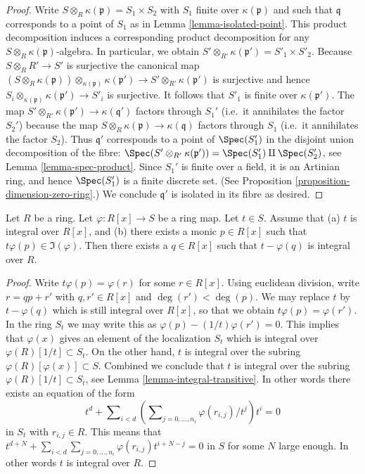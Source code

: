 \begin{proof}
Write $S \otimes_R \kappa(\mathfrak p) = S_1 \times S_2$
with $S_1$ finite over $\kappa(\mathfrak p)$ and such that
$\mathfrak q$ corresponds to a point of $S_1$ as in
Lemma \ref{lemma-isolated-point}. This product decomposition
induces a corresponding product decomposition for any
$S \otimes_R \kappa(\mathfrak p)$-algebra. In particular,
we obtain $S' \otimes_{R'} \kappa(\mathfrak p') = S'_1 \times S'_2$.
Because $S \otimes_R R' \to S'$ is surjective the canonical map
$(S \otimes_R \kappa(\mathfrak p)) \otimes_{\kappa(\mathfrak p)}
\kappa(\mathfrak p') \to S' \otimes_{R'} \kappa(\mathfrak p')$
is surjective and hence
$S_i \otimes_{\kappa(\mathfrak p)} \kappa(\mathfrak p') \to S'_i$
is surjective. It follows that $S'_1$ is finite over $\kappa(\mathfrak p')$.
The map $S' \otimes_{R'} \kappa(\mathfrak p') \to
\kappa(\mathfrak q')$ factors through $S_1'$
(i.e.\ it annihilates the factor $S_2'$)
because the map $S \otimes_R \kappa(\mathfrak p) \to
\kappa(\mathfrak q)$ factors through $S_1$
(i.e.\ it annihilates the factor $S_2$). Thus
$\mathfrak q'$ corresponds to a point of
$\Spec(S_1')$ in the disjoint union decomposition
of the fibre: $\Spec(S' \otimes_{R'} \kappa(\mathfrak p'))
= \Spec(S_1') \amalg \Spec(S_2')$, see
Lemma \ref{lemma-spec-product}.
Since $S_1'$ is finite over a field, it is an Artinian ring,
and hence $\Spec(S_1')$ is a finite discrete set.
(See Proposition \ref{proposition-dimension-zero-ring}.)
We conclude $\mathfrak q'$ is isolated in its fibre as
desired.
\end{proof}

\begin{lemma}
\label{lemma-make-integral-trick}
Let $R$ be a ring. Let $\varphi : R[x] \to S$ be
a ring map. Let $t \in S$.
Assume that (a) $t$ is integral over $R[x]$,
and (b) there exists a monic $p \in R[x]$ such that
$t \varphi(p) \in \Im(\varphi)$. Then there
exists a $q \in R[x]$ such that $t - \varphi(q)$
is integral over $R$.
\end{lemma}

\begin{proof}
Write $t \varphi(p) = \varphi(r)$ for some $r \in R[x]$.
Using euclidean division, write $r = qp + r'$ with
$q, r' \in R[x]$ and $\deg(r') < \deg(p)$. We may replace
$t$ by $t - \varphi(q)$ which is still integral over
$R[x]$, so that we obtain $t \varphi(p) = \varphi(r')$.
In the ring $S_t$ we may write this as
$\varphi(p) - (1/t) \varphi(r') = 0$.
This implies that $\varphi(x)$ gives an element of the
localization $S_t$ which is integral over
$\varphi(R)[1/t] \subset S_t$. On the other hand,
$t$ is integral over the subring $\varphi(R)[\varphi(x)] \subset S$.
Combined we conclude that $t$ is integral over
the subring $\varphi(R)[1/t] \subset S_t$, see Lemma
\ref{lemma-integral-transitive}. In other words
there exists an equation of the form
$$
t^d + \sum\nolimits_{i < d}
\left(\sum\nolimits_{j = 0, \ldots, n_i} \varphi(r_{i, j})/t^j\right) t^i = 0
$$
in $S_t$ with $r_{i, j} \in R$. This means that
$t^{d + N} +
\sum_{i < d} \sum_{j = 0, \ldots, n_i} \varphi(r_{i, j}) t^{i + N - j} = 0$
in $S$ for some $N$ large enough. In other words
$t$ is integral over $R$.
\end{proof}

